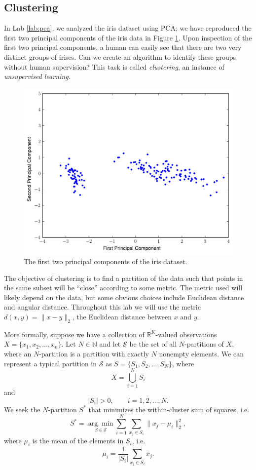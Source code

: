 
\subsection*{Clustering}
In Lab \ref{lab:pca}, we analyzed the iris dataset using PCA; we have reproduced the first two principal components of the iris data in Figure \ref{fig:iris_data}. 
Upon inspection of the first two principal components, a human can easily see that there are two very distinct groups of irises. 
Can we create an algorithm to identify these groups without human supervision? 
This task is called \emph{clustering}, an instance of \emph{unsupervised learning}.

\begin{figure}
\centering
\includegraphics[width=\textwidth]{iris_pca.pdf}
\caption{The first two principal components of the iris dataset.}
\label{fig:iris_data}
\end{figure}

The objective of clustering is to find a partition of the data such that points in the same subset will be ``close'' according to some metric. 
The metric used will likely depend on the data, but some obvious choices include Euclidean distance and angular distance. 
Throughout this lab we will use the metric $d(x,y) = \|x-y\|_2$, the Euclidean distance between $x$ and $y$.

More formally, suppose we have a collection of $\mathbb{R}^K$-valued observations $X = \{x_1,x_2,\ldots,x_n\}$. 
Let $N \in \mathbb{N}$ and let $\mathcal{S}$ be the set of all $N$-partitions of $X$, where an $N$-partition is a partition with exactly $N$ nonempty elements.
We can represent a typical partition in $\mathcal{S}$ as $S = \{S_1,S_2,\ldots,S_N\}$, where
\[
X = \bigcup_{i=1}^N S_i
\] 
and
\[
|S_i| > 0, \qquad i=1,2,\ldots,N.
\]
We seek the $N$-partition $S^*$ that minimizes the within-cluster sum of squares, i.e.
\[
S^* = \underset{S\in\mathcal{S}}{\arg\min} \sum_{i=1}^N\sum_{x_j\in S_i}\|x_j-\mu_i\|_2^2,
\]
where $\mu_i$ is the mean of the elements in $S_i$, i.e.
\[
\mu_i = \frac{1}{|S_i|}\sum_{x_j\in S_i}x_j.
\]

